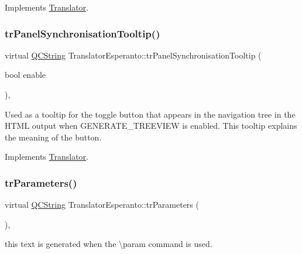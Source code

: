 Implements \mbox{\hyperlink{class_translator}{Translator}}.

\mbox{\label{class_translator_esperanto_a3e16b5facc6017269b0b67c393cfc954}} 
\subsubsection{\texorpdfstring{trPanelSynchronisationTooltip()}{trPanelSynchronisationTooltip()}}
{\footnotesize\ttfamily virtual \mbox{\hyperlink{class_q_c_string}{Q\+C\+String}} Translator\+Esperanto\+::tr\+Panel\+Synchronisation\+Tooltip (\begin{DoxyParamCaption}\item[{bool}]{enable }\end{DoxyParamCaption})\hspace{0.3cm}{\ttfamily [inline]}, {\ttfamily [virtual]}}

Used as a tooltip for the toggle button that appears in the navigation tree in the H\+T\+ML output when G\+E\+N\+E\+R\+A\+T\+E\+\_\+\+T\+R\+E\+E\+V\+I\+EW is enabled. This tooltip explains the meaning of the button. 

Implements \mbox{\hyperlink{class_translator}{Translator}}.

\mbox{\label{class_translator_esperanto_aa3844e21e452b085f7d988de483c797d}} 
\subsubsection{\texorpdfstring{trParameters()}{trParameters()}}
{\footnotesize\ttfamily virtual \mbox{\hyperlink{class_q_c_string}{Q\+C\+String}} Translator\+Esperanto\+::tr\+Parameters (\begin{DoxyParamCaption}{ }\end{DoxyParamCaption})\hspace{0.3cm}{\ttfamily [inline]}, {\ttfamily [virtual]}}

this text is generated when the \textbackslash{}param command is used. 


